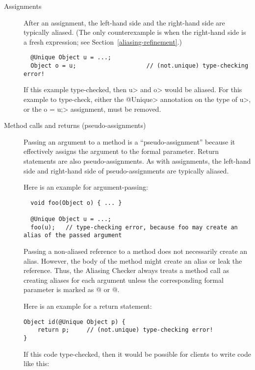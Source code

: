 \begin{description}
\item[Assignments]
After an assignment, the left-hand side and the right-hand side are
typically aliased.  (The only counterexample is when the right-hand side is
a fresh expression; see Section~\ref{aliasing-refinement}.)

\begin{Verbatim}
  @Unique Object u = ...;
  Object o = u;                    // (not.unique) type-checking error!
\end{Verbatim}

If this example type-checked, then \<u> and \<o> would be aliased.
For this example to type-check, either the \<@Unique> annotation on the
type of \<u>, or the \<o = u;> assignment, must be removed.

\item[Method calls and returns (pseudo-assignments)]
Passing an argument to a method is a ``pseudo-assignment'' because it effectively
assigns the argument to the formal parameter.  Return statements are also
pseudo-assignments.
As with assignments, the left-hand side and right-hand side of
pseudo-assignments are typically aliased.

Here is an example for argument-passing:

\begin{Verbatim}
  void foo(Object o) { ... }

  @Unique Object u = ...;
  foo(u);   // type-checking error, because foo may create an alias of the passed argument
\end{Verbatim}

Passing a non-aliased
reference to a method does not necessarily create an alias.
However, the body of the method might create an alias or leak the
reference.  Thus, the Aliasing Checker always treats a method call as
creating aliases for each argument unless the corresponding formal
parameter is marked as
@ or
@.

Here is an example for a return statement:

\begin{Verbatim}
Object id(@Unique Object p) {
    return p;     // (not.unique) type-checking error!
}
\end{Verbatim}

If this code type-checked, then it would be possible for clients to write
code like this:


\end{description}
